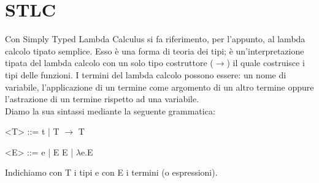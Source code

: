\documentclass[12pt,a4paper,openright,twoside]{report}
\begin{document}
\section{STLC}

Con Simply Typed Lambda Calculus si fa riferimento, per l'appunto, al lambda calcolo tipato semplice. Esso è una forma di teoria dei tipi; è un'interpretazione tipata del lambda calcolo con un solo tipo costruttore ($\rightarrow$) il quale costruisce i tipi delle funzioni. I termini del lambda calcolo possono essere: un nome di variabile, l'applicazione di un termine come argomento di un altro termine oppure l'astrazione di un termine rispetto ad una variabile.\\
Diamo la sua sintassi mediante la seguente grammatica:
\begin{grammar}\centering
 \let\syntleft\relax    %
 \let\syntright\relax   %
 <T> ::= t | T $\rightarrow$ T
 
 <E> ::= e | E E | $\lambda$e.E
\end{grammar}
Indichiamo con T i tipi e con E i termini (o espressioni).
\end{document}
